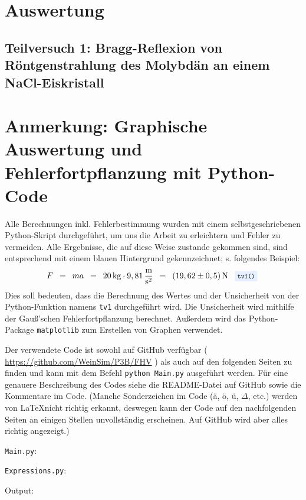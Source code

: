 \documentclass{article}
\newcommand{\widespace}{\enspace}
\newcommand{\wideeq}{\widespace = \widespace}
\newcommand{\result}[2]{
    #1 \, \text{#2}
}
\newcommand{\coderef}[1]{
    \text{
        \enspace
        \footnotesize
        \colorbox{codebg}{\texttt{#1()}}
    }
}
\newcommand{\githuburl}{
    \url{https://github.com/WeinSim/P3B/FHV}
}
\begin{document}
\newpage

\section{Auswertung}

    \subsection{Teilversuch 1: Bragg-Reflexion von Röntgenstrahlung des Molybdän an einem NaCl-Eiskristall}

    \newpage

\section{Anmerkung: Graphische Auswertung und Fehlerfortpflanzung mit Python-Code}

Alle Berechnungen inkl. Fehlerbestimmung wurden mit einem selbstgeschriebenen
Python-Skript durchgeführt, um uns die Arbeit zu erleichtern und Fehler zu
vermeiden. Alle Ergebnisse, die auf diese Weise zustande gekommen sind,
sind entsprechend mit einem \colorbox{codebg}{blauen Hintergrund} gekennzeichnet;
s. folgendes Beispiel:
\[
    F \wideeq ma \wideeq \result{20}{kg} \cdot 9,81 \, \frac{\text m}{\text s^2}
    \wideeq \result{(19,62 \pm 0,5)}{N} \coderef{tv1}
\]
Dies soll bedeuten, dass die Berechnung des Wertes und der Unsicherheit von der
Python-Funktion namens \verb|tv1| durchgeführt wird.
Die Unsicherheit wird mithilfe der Gauß'schen Fehlerfortpflanzung berechnet.
Außerdem wird das Python-Package \texttt{matplotlib} zum Erstellen
von Graphen verwendet.

Der verwendete Code ist sowohl auf GitHub verfügbar (\githuburl) als auch auf den
folgenden Seiten zu finden und kann mit dem Befehl \texttt{python Main.py}
ausgeführt werden. Für eine genauere Beschreibung des Codes siehe die README-Datei
auf GitHub sowie die Kommentare im Code.
(Manche Sonderzeichen im Code (ä, ö, ü, $\Delta$, etc.) werden von \LaTeX nicht
richtig erkannt, deswegen kann der Code auf den nachfolgenden Seiten an einigen
Stellen unvollständig erscheinen. Auf GitHub wird aber alles richtig angezeigt.)

\newpage


\verb|Main.py|:

\newpage

\verb|Expressions.py|:

\newpage

Output:

\end{document}
